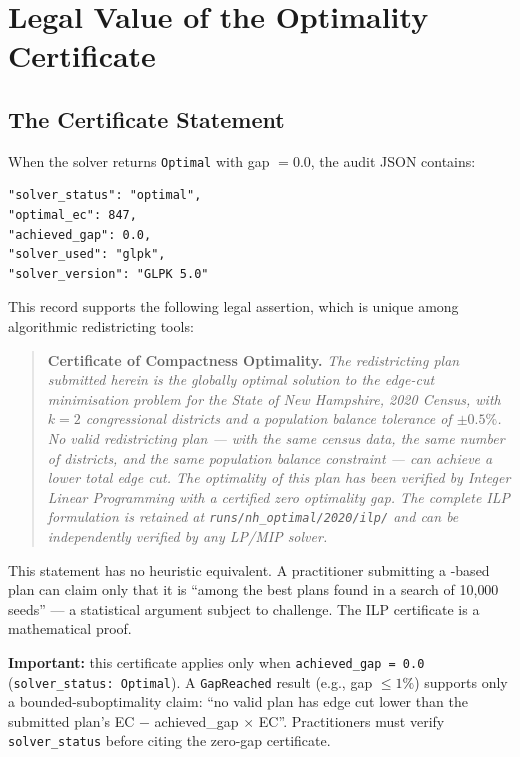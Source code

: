 \section{Legal Value of the Optimality Certificate}
\label{sec:legal}

\subsection{The Certificate Statement}

When the \ilp{} solver returns \texttt{Optimal} with gap $= 0.0$, the
audit JSON contains:

\begin{verbatim}
"solver_status": "optimal",
"optimal_ec": 847,
"achieved_gap": 0.0,
"solver_used": "glpk",
"solver_version": "GLPK 5.0"
\end{verbatim}

This record supports the following legal assertion, which is unique among
algorithmic redistricting tools:

\begin{quote}
\textbf{Certificate of Compactness Optimality.}
\textit{The redistricting plan submitted herein is the globally optimal
solution to the edge-cut minimisation problem for the State of New Hampshire,
2020 Census, with $k = 2$ congressional districts and a population balance
tolerance of $\pm 0.5\%$.
No valid redistricting plan --- with the same census data, the same number
of districts, and the same population balance constraint --- can achieve a
lower total edge cut.
The optimality of this plan has been verified by Integer Linear Programming
with a certified zero optimality gap.
The complete ILP formulation is retained at \texttt{runs/nh\_optimal/2020/ilp/}
and can be independently verified by any LP/MIP solver.}
\end{quote}

This statement has no heuristic equivalent.
A practitioner submitting a \metis{}-based plan can claim only that it is
``among the best plans found in a search of 10{,}000 seeds'' --- a
statistical argument subject to challenge.
The ILP certificate is a mathematical proof.

\textbf{Important:} this certificate applies only when
\texttt{achieved\_gap = 0.0} (\texttt{solver\_status: Optimal}).
A \texttt{GapReached} result (e.g., gap $\leq 1\%$) supports only a
bounded-suboptimality claim: ``no valid plan has edge cut lower than the
submitted plan's EC $-$ achieved\_gap $\times$ EC''.
Practitioners must verify \texttt{solver\_status} before citing the
zero-gap certificate.

